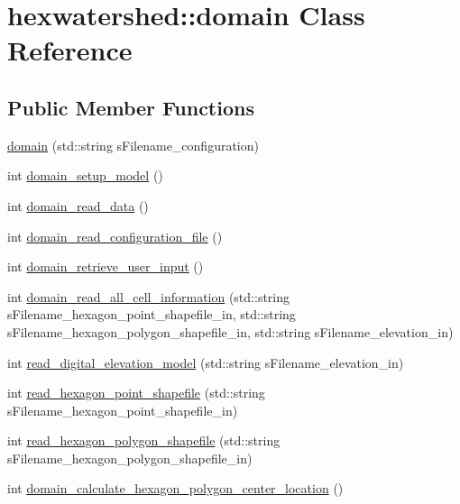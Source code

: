 \hypertarget{classhexwatershed_1_1domain}{\section{hexwatershed\-:\-:domain Class Reference}
\label{classhexwatershed_1_1domain}
}
\subsection*{Public Member Functions}
\begin{DoxyCompactItemize}
\item 
\hyperlink{classhexwatershed_1_1domain_a32bb46cf3d4cb241072e6b6379196aa1}{domain} (std\-::string s\-Filename\-\_\-configuration)
\item 
int \hyperlink{classhexwatershed_1_1domain_a48c7d4b2101d8a7e385f73c6ba4b5561}{domain\-\_\-setup\-\_\-model} ()
\item 
int \hyperlink{classhexwatershed_1_1domain_a66322aa4de2d4fec92791117648778ff}{domain\-\_\-read\-\_\-data} ()
\item 
int \hyperlink{classhexwatershed_1_1domain_a3e9019a4f1907f4d6f8f293c01231c30}{domain\-\_\-read\-\_\-configuration\-\_\-file} ()
\item 
int \hyperlink{classhexwatershed_1_1domain_a65b8a8fc2f0751aecdadf0cb9e046e96}{domain\-\_\-retrieve\-\_\-user\-\_\-input} ()
\item 
int \hyperlink{classhexwatershed_1_1domain_a4e57adf3f427614751e623017ba389b4}{domain\-\_\-read\-\_\-all\-\_\-cell\-\_\-information} (std\-::string s\-Filename\-\_\-hexagon\-\_\-point\-\_\-shapefile\-\_\-in, std\-::string s\-Filename\-\_\-hexagon\-\_\-polygon\-\_\-shapefile\-\_\-in, std\-::string s\-Filename\-\_\-elevation\-\_\-in)
\item 
int \hyperlink{classhexwatershed_1_1domain_aee114b17be1fb0a0fcd245653cad1272}{read\-\_\-digital\-\_\-elevation\-\_\-model} (std\-::string s\-Filename\-\_\-elevation\-\_\-in)
\item 
int \hyperlink{classhexwatershed_1_1domain_a33564ee8de427694e3e87db0c9cbbbb9}{read\-\_\-hexagon\-\_\-point\-\_\-shapefile} (std\-::string s\-Filename\-\_\-hexagon\-\_\-point\-\_\-shapefile\-\_\-in)
\item 
int \hyperlink{classhexwatershed_1_1domain_a0398863e0789867ff4c241c762e2556c}{read\-\_\-hexagon\-\_\-polygon\-\_\-shapefile} (std\-::string s\-Filename\-\_\-hexagon\-\_\-polygon\-\_\-shapefile\-\_\-in)
\item 
int \hyperlink{classhexwatershed_1_1domain_afca38447e56be20f7a6d2853fe7251bb}{domain\-\_\-calculate\-\_\-hexagon\-\_\-polygon\-\_\-center\-\_\-location} ()

\end{DoxyCompactItemize}
